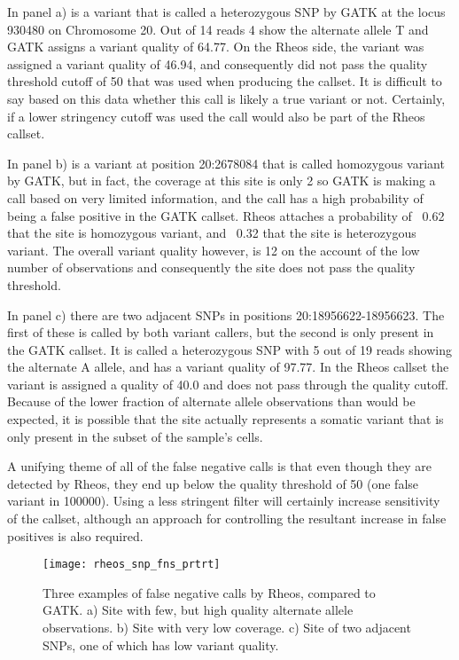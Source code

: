 In panel a) is a variant that is called a heterozygous SNP by GATK at the locus 930480 on Chromosome 20. Out of 14 reads 4 show the alternate allele T and GATK assigns a variant quality of 64.77. On the Rheos side, the variant was assigned a variant quality of 46.94, and consequently did not pass the quality threshold cutoff of 50 that was used when producing the callset. It is difficult to say based on this data whether this call is likely a true variant or not. Certainly, if a lower stringency cutoff was used the call would also be part of the Rheos callset.

In panel b) is a variant at position 20:2678084 that is called homozygous variant by GATK, but in fact, the coverage at this site is only 2 so GATK is making a call based on very limited information, and the call has a high probability of being a false positive in the GATK callset. Rheos attaches a probability of ~0.62 that the site is homozygous variant, and ~0.32 that the site is heterozygous variant. The overall variant quality however, is 12 on the account of the low number of observations and consequently the site does not pass the quality threshold.

In panel c) there are two adjacent SNPs in positions 20:18956622-18956623. The first of these is called by both variant callers, but the second is only present in the GATK callset. It is called a heterozygous SNP with 5 out of 19 reads showing the alternate A allele, and has a variant quality of 97.77. In the Rheos callset the variant is assigned a quality of 40.0 and does not pass through the quality cutoff. Because of the lower fraction of alternate allele observations than would be expected, it is possible that the site actually represents a somatic variant that is only present in the subset of the sample's cells.

A unifying theme of all of the false negative calls is that even though they are detected by Rheos, they end up below the quality threshold of 50 (one false variant in 100000). Using a less stringent filter will certainly increase sensitivity of the callset, although an approach for controlling the resultant increase in false positives is also required.

\begin{figure}[h!]
    \texttt{[image: rheos\_snp\_fns\_prtrt]}
    \centering
    \caption {Three examples of false negative calls by Rheos, compared to GATK. a) Site with few, but high quality alternate allele observations. b) Site with very low coverage. c) Site of two adjacent SNPs, one of which has low variant quality.}
    \label{fig:rheos_snp_fns}
\end{figure}


